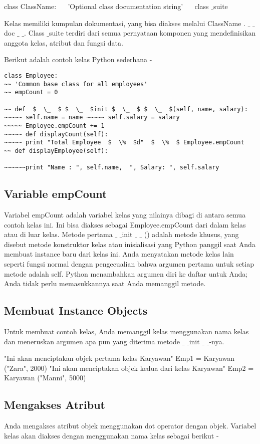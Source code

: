 class ClassName:
~~ 'Optional class documentation string'
~~ class $  \_  $suite

Kelas memiliki kumpulan dokumentasi, yang bisa diakses melalui ClassName . $  \_  $ $  \_  $ doc $  \_  $ $  \_  $.  Class $  \_  $suite terdiri dari semua pernyataan komponen yang mendefinisikan anggota kelas, atribut dan fungsi data.


Berikut adalah contoh kelas Python sederhana -
\begin{verbatim}
class Employee:
~~ 'Common base class for all employees'
~~ empCount = 0

~~ def  $  \_  $ $  \_  $init $  \_  $ $  \_  $(self, name, salary):
~~~~~ self.name = name ~~~~~ self.salary = salary
~~~~~ Employee.empCount += 1
~~~~~ def displayCount(self):
~~~~~ print "Total Employee  $  \%  $d"  $  \%  $ Employee.empCount
~~ def displayEmployee(self):

~~~~~~print "Name : ", self.name,  ", Salary: ", self.salary
\end{verbatim}

\subsection{Variable empCount}
Variabel empCount adalah variabel kelas yang nilainya dibagi di antara semua contoh kelas ini. Ini bisa diakses sebagai Employee.empCount dari dalam kelas atau di luar kelas. Metode pertama  $  \_  $ $  \_  $init  $  \_  $ $  \_ $ () adalah metode khusus, yang disebut metode konstruktor kelas atau inisialisasi yang Python panggil saat Anda membuat instance baru dari kelas ini. Anda menyatakan metode kelas lain seperti fungsi normal dengan pengecualian bahwa argumen pertama untuk setiap metode adalah self. Python menambahkan argumen diri ke daftar untuk Anda; Anda tidak perlu memasukkannya saat Anda memanggil metode.


\subsection{Membuat Instance Objects}
Untuk membuat contoh kelas, Anda memanggil kelas menggunakan nama kelas dan meneruskan argumen apa pun yang diterima metode  $  \_  $ $  \_  $init $  \_  $ $  \_  $-nya.

"Ini akan menciptakan objek pertama kelas Karyawan"
Emp1 = Karyawan ("Zara", 2000)
"Ini akan menciptakan objek kedua dari kelas Karyawan"
Emp2 = Karyawan ("Manni", 5000)


\subsection{Mengakses Atribut}
Anda mengakses atribut objek menggunakan dot operator dengan objek. Variabel kelas akan diakses dengan menggunakan nama kelas sebagai berikut -

